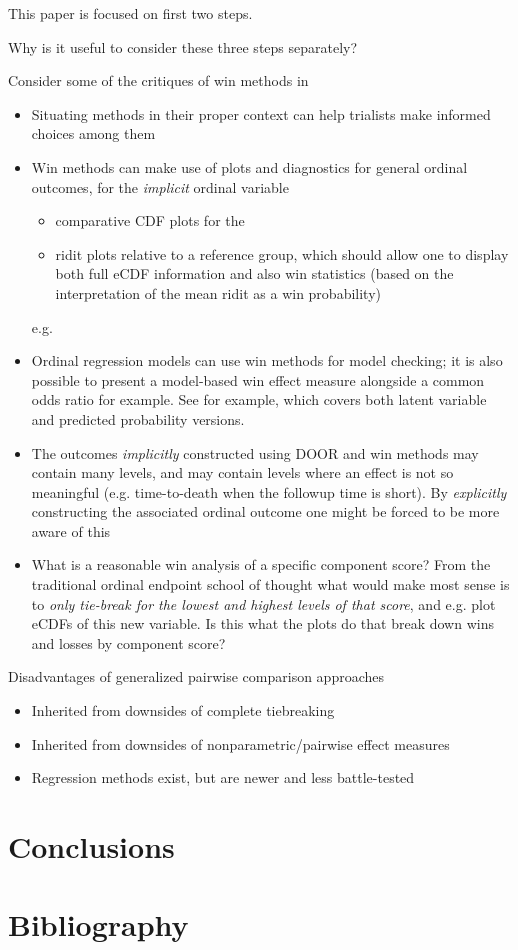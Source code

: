\documentclass[
  11pt,
  fleqn
]{article}
\begin{document}
This paper is focused on first two steps.

Why is it useful to consider these three steps separately?

Consider some of the critiques of win methods in
\citet[e.g.~][]{ajufoFallaciesUsingWin2023}

\begin{itemize}
  \item Situating methods in their proper context can help
    trialists make informed choices among them
  \item Win methods can make use of
    plots and diagnostics for general ordinal outcomes, for the
    \emph{implicit} ordinal variable
    \begin{itemize}
      \item
        comparative CDF plots for the
      \item ridit plots
        \citep{brossHowUseRidit1958,jansenRiditAnalysisReview1984}
        relative to a reference group, which should allow one to
        display both full eCDF information and also win statistics
        (based on the interpretation of the mean ridit as a win probability)
    \end{itemize}e.g.
  \item Ordinal regression models can use win methods for model
    checking; it is
    also possible to present a model-based win effect measure
    alongside a common
    odds ratio for example. See
    \citep{agrestiOrdinalProbabilityEffect2017} for example, which
    covers both latent variable and predicted probability versions.
  \item The outcomes \emph{implicitly} constructed using
    DOOR and win methods may contain many levels, and may contain
    levels where an
    effect is not so meaningful (e.g. time-to-death when the followup time is
    short). By \emph{explicitly} constructing the associated
    ordinal outcome one
    might be forced to be more aware of this
  \item What is a reasonable win
    analysis of a specific component score? From the traditional
    ordinal endpoint
    school of thought what would make most sense is to \emph{only
      tie-break for the
    lowest and highest levels of that score}, and e.g. plot eCDFs of this new
    variable. Is this what the plots do that break down wins and losses by
    component score?
\end{itemize}

Disadvantages of generalized pairwise comparison approaches
\begin{itemize}
  \item Inherited from downsides of complete tiebreaking
  \item Inherited from downsides of nonparametric/pairwise effect measures
  \item Regression methods exist, but are newer and less battle-tested
\end{itemize}


\section{Conclusions}

\newpage

\section{Bibliography}

\printbibliography
\end{document}
